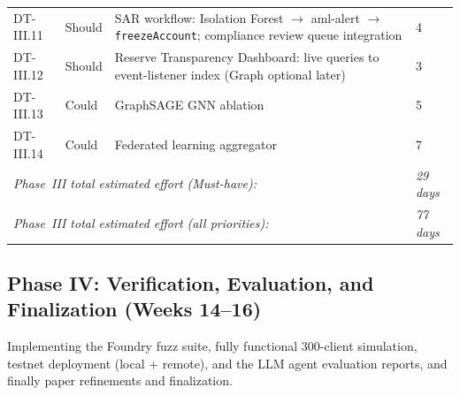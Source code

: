 \documentclass[12pt,a4paper]{report}
\begin{document}
\begin{table}[H]
\begin{tabular}{p{1.8cm}p{1.8cm}p{7.5cm}p{1.5cm}}
DT-III.11 & Should & SAR workflow: Isolation Forest $\to$ aml-alert $\to$ \texttt{freezeAccount}; compliance review queue integration & 4 \\
DT-III.12 & Should & Reserve Transparency Dashboard: live queries to event-listener index (Graph optional later) & 3 \\
DT-III.13 & Could & GraphSAGE GNN ablation & 5 \\
DT-III.14 & Could & Federated learning aggregator & 7 \\
\multicolumn{3}{l}{\textit{Phase~III total estimated effort (Must-have):}} & \textit{29 days} \\
\multicolumn{3}{l}{\textit{Phase~III total estimated effort (all priorities):}} & \textit{77 days} \\
\bottomrule
\end{tabular}
\end{table}

\subsection{Phase IV: Verification, Evaluation, and Finalization (Weeks 14--16)}

Implementing the Foundry fuzz suite, fully functional 300-client simulation, testnet deployment (local + remote), and the LLM agent evaluation reports, and finally paper refinements and finalization.
\end{document}
